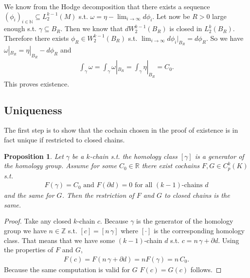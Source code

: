 \documentclass[12pt,a4paper]{article}
\newtheorem{proposition}{Proposition}
\theoremstyle{definition}
\newcommand{\real}{\mathbb{R}}
\begin{document}
We know from the Hodge decomposition that there exists a sequence
$(\phi_i)_{i\in \mathbb{N}} \subseteq L^{k-1}_2(M)$ s.t. 
$\omega = \eta - \lim_{i \rightarrow \infty} d\phi_i$.
Let now be $R>0$ large enough s.t. $\gamma \subseteq B_R$. Then we know that
$d W^{k-1}_2(B_R)$ is closed in $L_2^k(B_R)$. Therefore there exists 
$\phi_R \in  W^{k-1}_2(B_R)$ s.t. 
$\lim_{i \rightarrow \infty} d\phi_i|_{B_R} = d\phi_R$. So we have
$\omega|_{B_R} = \eta|_{B_R} - d\phi_R$ and 
\begin{align*}
\int_\gamma \omega = \int_\gamma \omega|_{B_R} = \int_\gamma \eta|_{B_R} = C_0.
\end{align*}
This proves existence.

\subsection{Uniqueness}

The first step is to show that the cochain chosen in the proof of existence
is in fact unique if restricted to closed chains.

\begin{proposition}
    Let $\gamma$ be a $k$-chain s.t. the homology class $[\gamma]$ 
    is a generator of the homology group. Assume for some $C_0 \in \real$ 
    there exist cochains $F,G \in C^k_p(K)$ s.t.
    \begin{align*}
    F(\gamma) = C_0 \text{ and } F(\partial d) = 0 
    \text{ for all } (k-1) \text{-chains } d
    \end{align*}
    and the same for $G$. Then the restriction of $F$ and $G$ to closed 
    chains is the same.
\end{proposition} \label{uniqueness_cochain}
\begin{proof}
    Take any closed $k$-chain $c$. Because $\gamma$ is the generator of the 
    homology group we have $n \in \mathbb{Z}$ s.t. $[c] = [n \, \gamma]$
    where $[\cdot]$ is the corresponding homology class. That means that we have
    some $(k-1)$-chain $d$ s.t. $c = n \, \gamma + \partial d$. Using the 
    properties of $F$ and $G$,
    \begin{align*}
        F(c) = F(n \, \gamma + \partial d) = n F(\gamma) = n \, C_0.
    \end{align*}
    Because the same computation is valid for $G$ $F(c) = G(c)$ follows.
\end{proof}
\end{document}
